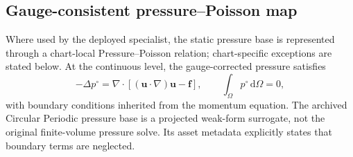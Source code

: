 \subsection{Gauge-consistent pressure--Poisson map}

Where used by the deployed specialist, the static pressure base is represented through a chart-local
Pressure--Poisson relation; chart-specific exceptions are stated below.
At the continuous level, the gauge-corrected pressure satisfies
\begin{equation}
    -\Delta p^\circ
    =
    \nabla\!\cdot
    \left[
        (\bm u\!\cdot\!\nabla)\bm u
        -
        \bm f
    \right],
    \qquad
    \int_\Omega p^\circ\,\mathrm d\Omega=0,
    \label{eq:app_continuous_pressure_poisson}
\end{equation}
with boundary conditions inherited from the momentum equation. The archived Circular Periodic pressure base is a projected weak-form surrogate, not the original finite-volume pressure solve. Its asset metadata explicitly states that boundary terms are neglected.

